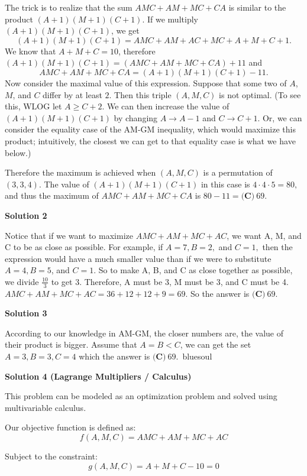 \begin{enumerate}
The trick is to realize that the sum $AMC+AM+MC+CA$ is similar to the product $(A+1)(M+1)(C+1)$. If we multiply $(A+1)(M+1)(C+1)$, we get 
 \[(A+1)(M+1)(C+1) = AMC + AM + AC + MC + A + M + C + 1.\] We know that $A+M+C=10$, therefore $(A+1)(M+1)(C+1) = (AMC + AM + MC + CA) + 11$ and 
 \[AMC + AM + MC + CA = (A+1)(M+1)(C+1) - 11.\] Now consider the maximal value of this expression. Suppose that some two of $A$, $M$, and $C$ differ by at least $2$.  Then this triple $(A,M,C)$ is not optimal. (To see this, WLOG let $A\geq C+2.$ We can then increase the value of $(A+1)(M+1)(C+1)$ by changing $A \to A-1$ and $C \to C+1$. Or, we can consider the equality case of the AM-GM inequality, which would maximize this product; intuitively, the closest we can get to that equality case is what we have below.)

 Therefore the maximum is achieved when $(A,M,C)$ is a permutation of $(3,3,4)$. The value of $(A+1)(M+1)(C+1)$ in this case is $4\cdot 4\cdot 5=80,$ and thus the maximum of $AMC + AM + MC + CA$ is $80-11 = \boxed{\textbf{(C)}\ 69}.$




\textbf{Solution 2}

Notice that if we want to maximize $AMC + AM + MC + AC$, we want A, M, and C to be as close as possible. For example, if $A = 7, B = 2,$ and $C=1,$ then the expression would have a much smaller value than if we were to substitute $A = 4, B = 5$, and $C = 1$. So to make A, B, and C as close together as possible, we divide $\frac{10}{3}$ to get $3$. Therefore, A must be 3, M must be 3, and C must be 4.  $AMC + AM + MC + AC = 36 + 12 + 12 + 9 = 69$. So the answer is $\boxed{\textbf{(C)}\ 69.}$




\textbf{Solution 3}

According to our knowledge in AM-GM, the closer numbers are, the value of their product is bigger. Assume that $A=B<C$, we can get the set $A=3,B=3,C=4$ which the answer is $\boxed{\textbf{(C)}\ 69.}$~bluesoul

 



\textbf{Solution 4 (Lagrange Multipliers / Calculus)}

This problem can be modeled as an optimization problem and solved using multivariable calculus.

 Our objective function is defined as:
 \[f(A, M, C) = AMC + AM + MC + AC\]

 Subject to the constraint:
 \[g(A, M, C) = A + M + C - 10 = 0\]


\end{enumerate}
